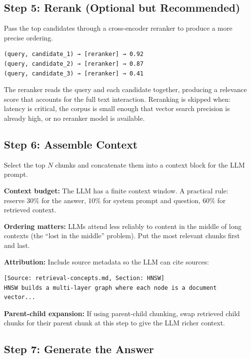 \subsection{Step 5: Rerank (Optional but Recommended)}

Pass the top candidates through a cross-encoder reranker to produce a more precise ordering.

\begin{Verbatim}
(query, candidate_1) → [reranker] → 0.92
(query, candidate_2) → [reranker] → 0.87
(query, candidate_3) → [reranker] → 0.41
\end{Verbatim}

The reranker reads the query and each candidate together, producing a relevance score that
accounts for the full text interaction. Reranking is skipped when: latency is critical, the
corpus is small enough that vector search precision is already high, or no reranker model is
available.

\subsection{Step 6: Assemble Context}

Select the top $N$ chunks and concatenate them into a context block for the LLM prompt.

\textbf{Context budget:} The LLM has a finite context window. A practical rule: reserve 30\%
for the answer, 10\% for system prompt and question, 60\% for retrieved context.

\textbf{Ordering matters:} LLMs attend less reliably to content in the middle of long contexts
(the ``lost in the middle'' problem). Put the most relevant chunks first and last.

\textbf{Attribution:} Include source metadata so the LLM can cite sources:

\begin{Verbatim}
[Source: retrieval-concepts.md, Section: HNSW]
HNSW builds a multi-layer graph where each node is a document vector...
\end{Verbatim}

\textbf{Parent-child expansion:} If using parent-child chunking, swap retrieved child chunks
for their parent chunk at this step to give the LLM richer context.

\subsection{Step 7: Generate the Answer}

